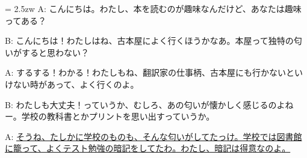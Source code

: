 \documentclass[11pt]{amsart}
\title{}
\author{}
\newenvironment{hangall}[1]{\hangindent = 2.5zw\everypar{\hangindent = 2.5zw}}{}
\begin{document}
\maketitle
\begin{hangall}{}%
A: こんにちは。わたし、本を読むのが趣味なんだけど、あなたは趣味ってある？

B: こんにちは！わたしはね、古本屋によく行くほうかなあ。本屋って独特の匂いがすると思わない？

A: するする！わかる！わたしもね、翻訳家の仕事柄、古本屋にも行かないといけない時があって、よく行くのよ。

B: わたしも大丈夫！っていうか、むしろ、あの匂いが懐かしく感じるのよねー。学校の教科書とかプリントを思い出すっていうか。

A: \ul{そうね、たしかに学校のものも、そんな匂いがしてたっけ。学校では図書館に籠って、よくテスト勉強の暗記をしてたわ。わたし、暗記は得意なのよ。}\end{hangall}
\end{document}
